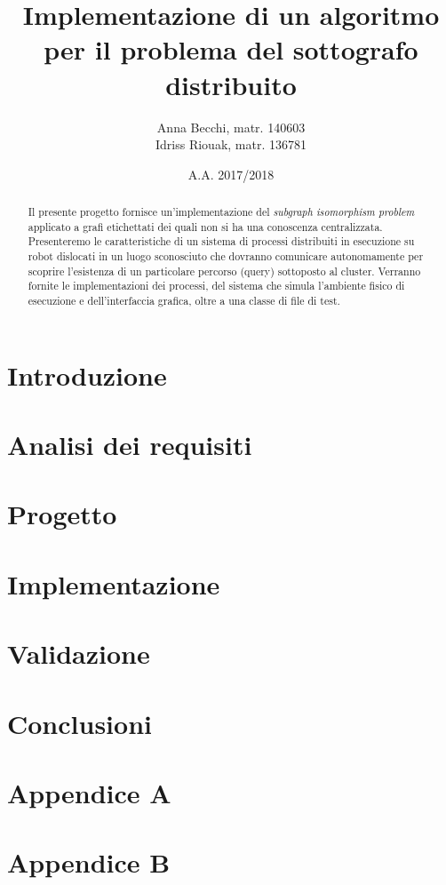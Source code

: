 \documentclass{checkpoint/llncs}
\title{Implementazione di un algoritmo\\
  per il problema del sottografo distribuito}
\author{Anna Becchi, matr. 140603\\
  Idriss Riouak, matr. 136781}
\institute{Laurea Magistrale in Informatica\\Universit\`a di Udine}
\date{A.A. 2017/2018}
\begin{document}
\maketitle
\begin{abstract}
  Il presente progetto fornisce un'implementazione del
  \emph{subgraph isomorphism problem} applicato a grafi
  etichettati dei quali non si ha una conoscenza centralizzata.
  Presenteremo le caratteristiche di un sistema di processi
  distribuiti in esecuzione su robot dislocati in un
  luogo sconosciuto che dovranno comunicare autonomamente
  per scoprire l'esistenza di un particolare percorso
  (query) sottoposto al cluster.
  Verranno fornite le implementazioni dei
  processi, del sistema che simula l'ambiente fisico
  di esecuzione e dell'interfaccia grafica, oltre a una
  classe di file di test.
\end{abstract}

\section{Introduzione}
\label{ch:intro}


\newpage
\section{Analisi dei requisiti}
\label{ch:analysis}


\newpage
\section{Progetto}
\label{ch:project}


\newpage
\section{Implementazione}
\label{ch:impl}


\newpage
\section{Validazione}
\label{ch:validation}


\newpage
\section{Conclusioni}
\label{ch:conclusions}


\newpage
\appendix
\section{Appendice A}
\label{ch:appendixA}

\newpage

\appendix
\section{Appendice B}
\label{ch:appendixB}

\end{document}
